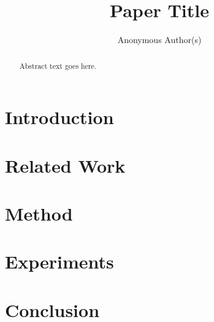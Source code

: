 \documentclass[sigplan,review,anonymous,nonacm,balance=false]{acmart}
\begin{document}
\title{Paper Title}

\author{Anonymous Author(s)}

\begin{abstract}
Abstract text goes here.
\end{abstract}

\maketitle

\section{Introduction}

\section{Related Work}

\section{Method}

\section{Experiments}

\section{Conclusion}



\end{document}

